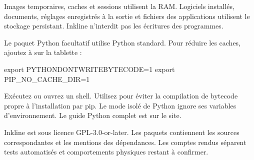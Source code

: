 Images temporaires, caches et sessions utilisent la RAM. Logiciels installés,
documents, réglages enregistrés à la sortie et fichiers des applications
utilisent le stockage persistant. Inkline n'interdit pas les écritures des programmes.

Le paquet Python facultatif utilise Python standard. Pour réduire les caches,
ajoutez à  sur la tablette :
\begin{shell}
export PYTHONDONTWRITEBYTECODE=1
export PIP_NO_CACHE_DIR=1
\end{shell}
Exécutez  ou ouvrez un shell. Utilisez
 pour éviter la compilation
de bytecode propre à l'installation par pip. Le mode isolé de Python ignore
ses variables d'environnement. Le guide Python complet est sur le site.

Inkline est sous licence GPL-3.0-or-later. Les paquets contiennent les sources
correspondantes et les mentions des dépendances. Les comptes rendus séparent
tests automatisés et comportements physiques restant à confirmer.
